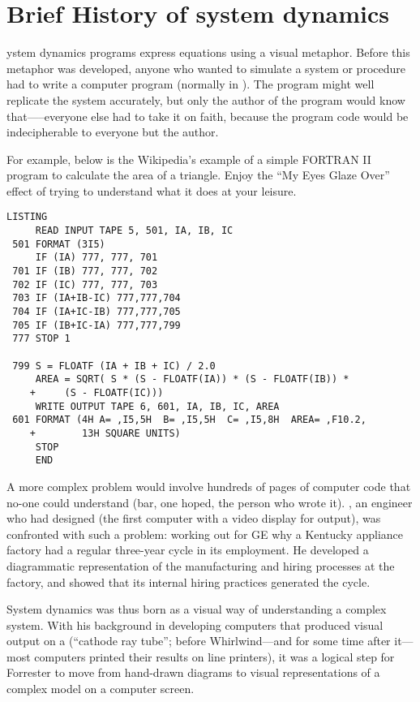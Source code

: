\chapter{Brief History of system dynamics}

ystem dynamics programs express equations using a visual
metaphor. Before this metaphor was developed, anyone who wanted to
simulate a system or procedure had to write a computer program
(normally in
). The
program might well replicate the system accurately, but only the
author of the program would know that—--everyone else had to take it on
faith, because the program code would be indecipherable to everyone
but the author.



For example, below is the Wikipedia’s example of a simple FORTRAN II
program to calculate the area of a triangle. Enjoy the ``My Eyes Glaze
Over'' effect of trying to understand what it does at your leisure.

\begin{verbatim}
LISTING
     READ INPUT TAPE 5, 501, IA, IB, IC
 501 FORMAT (3I5)
     IF (IA) 777, 777, 701
 701 IF (IB) 777, 777, 702
 702 IF (IC) 777, 777, 703
 703 IF (IA+IB-IC) 777,777,704
 704 IF (IA+IC-IB) 777,777,705
 705 IF (IB+IC-IA) 777,777,799
 777 STOP 1

 799 S = FLOATF (IA + IB + IC) / 2.0
     AREA = SQRT( S * (S - FLOATF(IA)) * (S - FLOATF(IB)) *
    +     (S - FLOATF(IC)))
     WRITE OUTPUT TAPE 6, 601, IA, IB, IC, AREA
 601 FORMAT (4H A= ,I5,5H  B= ,I5,5H  C= ,I5,8H  AREA= ,F10.2,
    +        13H SQUARE UNITS)
     STOP
     END
\end{verbatim}

A more complex problem would involve hundreds of pages of computer
code that no-one could understand (bar, one hoped, the person who
wrote it). , an engineer
who had designed
(the
first computer with a video display for output), was confronted with
such a problem: working out for GE why a Kentucky appliance factory
had a regular three-year cycle in its employment. He developed a
diagrammatic representation of the manufacturing and hiring processes
at the factory, and showed that its internal hiring practices
generated the cycle.


System dynamics was thus born as a visual way of understanding a
complex system. With his background in developing computers that
produced visual output on a
(``cathode ray tube''; before Whirlwind---and for some time after
it---most computers printed their results on line printers), it was a
logical step for Forrester to move from hand-drawn diagrams to visual
representations of a complex model on a computer screen. 

